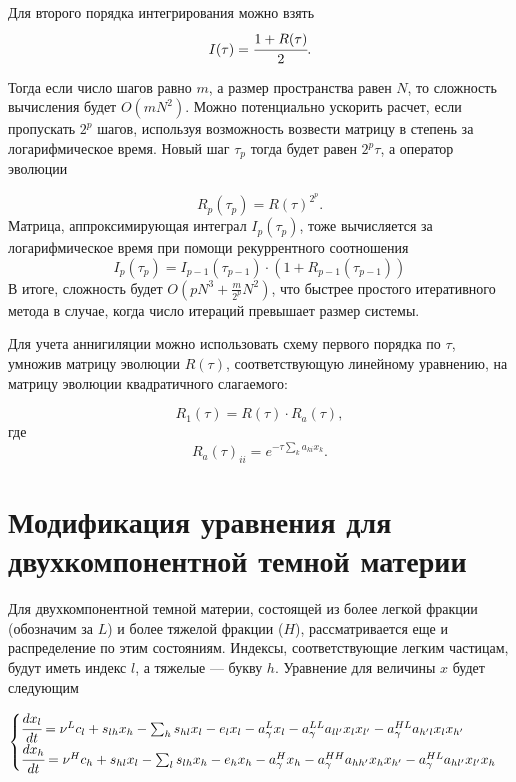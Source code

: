 Для второго порядка интегрирования можно взять
\begin{equation}
	\label{eq:I_tau}
	I(\tau) = \cfrac{1+R(\tau)}{2}.
\end{equation}

Тогда если число шагов равно $m$, а размер пространства равен $N$, то сложность вычисления будет $O(mN^2)$.
Можно потенциально ускорить расчет, если пропускать $2^p$ шагов, используя возможность возвести матрицу в степень за логарифмическое время. Новый шаг $\tau_p$ тогда будет равен $2^p \tau$, а оператор эволюции 

\begin{equation}
	R_p(\tau_p) = R(\tau)^{2^p}.
\end{equation}
Матрица, аппроксимирующая интеграл $I_p(\tau_p)$, тоже вычисляется за логарифмическое время при помощи рекуррентного соотношения
\begin{equation}
	I_p(\tau_p) = I_{p-1}(\tau_{p-1})\cdot (1 + R_{p-1}(\tau_{p-1}))
\end{equation}
В итоге, сложность будет $O(p N^3 + \frac{m}{2^p}N^2)$, что быстрее простого итеративного метода в случае, когда число итераций превышает размер системы.

Для учета аннигиляции можно использовать схему первого порядка по $\tau$, умножив матрицу эволюции $R(\tau)$, соответствующую линейному уравнению, на матрицу эволюции квадратичного слагаемого:

\begin{equation}
	R_1(\tau) = R(\tau)\cdot R_a(\tau),
\end{equation}
где
\begin{equation}
	R_a(\tau)_{ii} = e^{-\tau\sum_k{a_{ki}x_k}}.
\end{equation}

\section{Модификация уравнения для двухкомпонентной темной материи}

Для двухкомпонентной темной материи, состоящей из более легкой фракции (обозначим за $L$) и более тяжелой фракции ($H$), рассматривается еще и распределение по этим состояниям. Индексы, соответствующие легким частицам, будут иметь индекс $l$, а тяжелые --- букву $h$. Уравнение для величины $x$ будет следующим

\begin{equation}
	\label{eq:evolution_inelastic}
	\begin{cases}
		\cfrac{d x_l}{d t} = \nu^L c_l + s_{lh} x_h - \sum_h{s_{hl}}x_l - e_l x_l - a_{\gamma}^{L} x_l - a_{\gamma}^{LL} a_{l l'} x_l x_{l'}  - a_{\gamma}^{HL} a_{h' l} x_l x_{h'}\\
		\cfrac{d x_h}{d t} = \nu^H c_h + s_{hl} x_l - \sum_l{s_{lh}}x_h - e_h x_h - a_{\gamma}^{H} x_h
		- a_{\gamma}^{HH} a_{h h'} x_h x_{h'}  - a_{\gamma}^{HL} a_{h l'} x_{l'} x_{h}\\
	\end{cases}
\end{equation}

